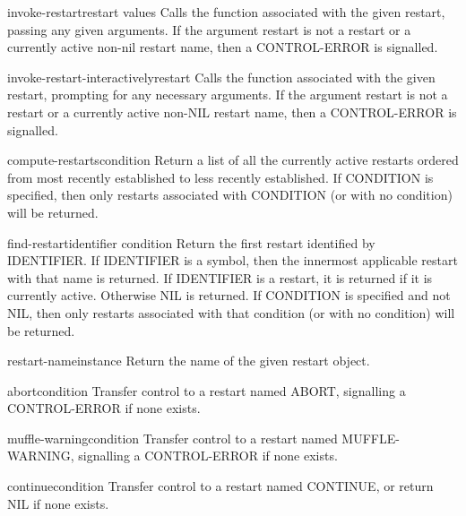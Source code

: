 \documentclass[10pt,english]{book}
\begin{document}
\begin{function}{invoke-restart}{restart \rest values}
  Calls the function associated with the given restart, passing any given
   arguments. If the argument restart is not a restart or a currently active
   non-nil restart name, then a CONTROL-ERROR is signalled.
\end{function}

\begin{function}{invoke-restart-interactively}{restart}
  Calls the function associated with the given restart, prompting for any
   necessary arguments. If the argument restart is not a restart or a
   currently active non-NIL restart name, then a CONTROL-ERROR is signalled.
\end{function}

\begin{function}{compute-restarts}{\op condition}
  Return a list of all the currently active restarts ordered from most recently
established to less recently established. If CONDITION is specified, then only
restarts associated with CONDITION (or with no condition) will be returned.
\end{function}

\begin{function}{find-restart}{identifier \op condition}
  Return the first restart identified by IDENTIFIER. If IDENTIFIER is a symbol,
then the innermost applicable restart with that name is returned. If IDENTIFIER
is a restart, it is returned if it is currently active. Otherwise NIL is
returned. If CONDITION is specified and not NIL, then only restarts associated
with that condition (or with no condition) will be returned.
\end{function}

\begin{function}{restart-name}{instance}
  Return the name of the given restart object.
\end{function}

\begin{function}{abort}{\op condition}
  Transfer control to a restart named ABORT, signalling a CONTROL-ERROR if
   none exists.
\end{function}

\begin{function}{muffle-warning}{\op condition}
  Transfer control to a restart named MUFFLE-WARNING, signalling a
   CONTROL-ERROR if none exists.
\end{function}

\begin{function}{continue}{\op condition}
  Transfer control to a restart named CONTINUE, or return NIL if none exists.
\end{function}
\end{document}
